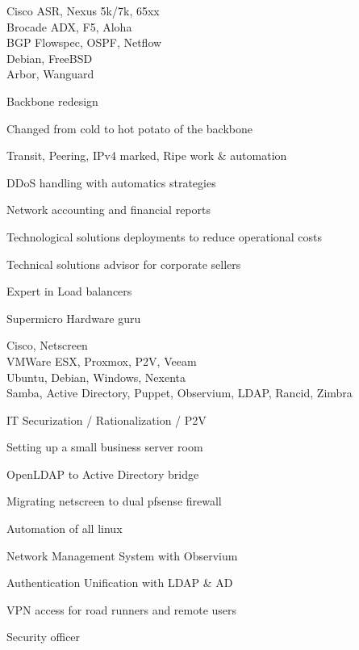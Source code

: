 \documentclass[a4paper,11pt]{cv4tw}%
\begin{document}
	{Cisco ASR, Nexus 5k/7k, 65xx\\Brocade ADX, F5, Aloha\\BGP Flowspec, OSPF, Netflow\\Debian, FreeBSD\\Arbor, Wanguard}
		{ Backbone redesign
		\begin{missions}
			\item Changed from cold to hot potato of the backbone
			\item Transit, Peering, IPv4 marked, Ripe work \& automation
			\item DDoS handling with automatics strategies
			\item Network accounting and financial reports
			\item Technological solutions deployments to reduce operational costs
			\item Technical solutions advisor for corporate sellers
			\item Expert in Load balancers
			\item Supermicro Hardware guru
		\end{missions}
	}

	{Cisco, Netscreen\\VMWare ESX, Proxmox, P2V, Veeam\\Ubuntu, Debian, Windows, Nexenta\\Samba, Active Directory, Puppet, Observium, LDAP, Rancid, Zimbra}
		{ IT Securization / Rationalization / P2V 
		\begin{missions}
			\item Setting up a small business server room
			\item OpenLDAP to Active Directory bridge
			\item Migrating netscreen to dual pfsense firewall
			\item Automation of all linux
			\item Network Management System with Observium
			\item Authentication Unification with LDAP \& AD
			\item VPN access for road runners and remote users
			\item Security officer
		\end{missions}
	}
\end{document}
